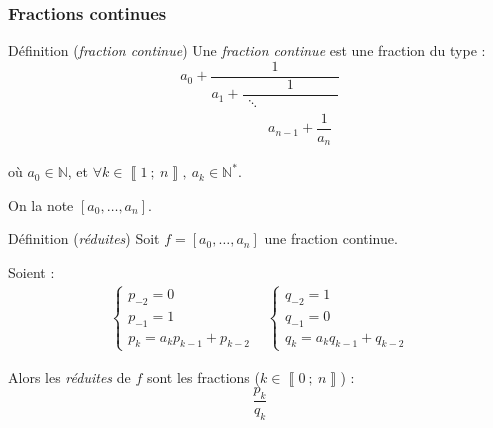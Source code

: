 \documentclass{beamer}
\newcommand{\N}{\mathbb{N}} %
\newcommand{\nset}[2]{\left\llbracket #1\ ;\ #2 \right\rrbracket}
\newcommand{\lr}[1]{\left( #1 \right)}
\begin{document}
    \begin{frame}[allowframebreaks]
        \frametitle{Fractions continues}

        \begin{block}{Définition (\emph{fraction continue})}
            Une \emph{fraction continue} est une fraction du type :
            \[
                a_0 + \dfrac{1}{a_1 + \dfrac{1}{
                    \begin{array}{ll}
                        \ddots \!\!\!\!\!\!\!\!
                        \\
                        & a_{n - 1} + \dfrac 1 {a_n}
                    \end{array}
                }}
            \]

            où $a_0 \in \N$, et $\forall k \in \nset 1 n,\ a_k \in \N^*$.

            On la note $[a_0, \ldots, a_n]$.
        \end{block}

        \newpage

        \begin{block}{Définition (\emph{réduites})}
            Soit $f = [a_0, \ldots, a_n]$ une fraction continue.

            Soient :
            \[
                \begin{array}{cc}
                    \begin{cases}
                        p_{-2} = 0
                        \\
                        p_{-1} = 1
                        \\
                        p_k = a_k p_{k - 1} + p_{k - 2}
                    \end{cases}
                    &
                    \begin{cases}
                        q_{-2} = 1
                        \\
                        q_{-1} = 0
                        \\
                        q_k = a_k q_{k - 1} + q_{k - 2}
                    \end{cases}
                \end{array}
            \]

            Alors les \emph{réduites} de $f$ sont les fractions ($k \in \nset 0 n$) :
            \[
                \dfrac{p_k}{q_k}
            \]
        \end{block}


\end{frame}
\end{document}
